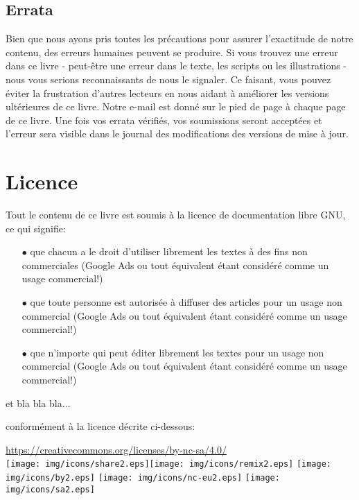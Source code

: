 	\subsection{Errata}
	Bien que nous ayons pris toutes les pr\'ecautions pour assurer l'exactitude de notre contenu, des erreurs humaines peuvent se produire. Si vous trouvez une erreur dans ce livre - peut-être une erreur dans le texte, les scripts ou les illustrations - nous vous serions reconnaissants de nous le signaler. Ce faisant, vous pouvez \'eviter la frustration d'autres lecteurs en nous aidant à am\'eliorer les versions ult\'erieures de ce livre. Notre e-mail est donn\'e sur le pied de page à chaque page de ce livre. Une fois vos errata v\'erifi\'es, vos soumissions seront accept\'ees et l'erreur sera visible dans le journal des modifications des versions de mise à jour.

	\newpage
	\thispagestyle{empty}
	\mbox{}
	\section{Licence}
	Tout le contenu de ce livre est soumis à la licence de documentation libre GNU, ce qui signifie:
	\begin{itemize}
			\item[$\bullet$] que chacun a le droit d'utiliser librement les textes à des fins non commerciales (Google Ads ou tout \'equivalent \'etant consid\'er\'e comme un usage commercial!)
			\item[$\bullet$] que toute personne est autoris\'ee à diffuser des articles pour un usage non commercial (Google Ads ou tout \'equivalent \'etant consid\'er\'e comme un usage commercial!)
			\item[$\bullet$] que n'importe qui peut \'editer librement les textes pour un usage non commercial (Google Ads ou tout \'equivalent \'etant consid\'er\'e comme un usage commercial!)
	\end{itemize}
	
	et bla bla bla...

	conform\'ement à la licence d\'ecrite ci-dessous: 
	
	\begin{center}
	\url{https://creativecommons.org/licenses/by-nc-sa/4.0/}\\[2pt]
\texttt{[image: img/icons/share2.eps]}\texttt{[image: img/icons/remix2.eps]}
\texttt{[image: img/icons/by2.eps]}
\texttt{[image: img/icons/nc-eu2.eps]}
\texttt{[image: img/icons/sa2.eps]}
	\end{center}

